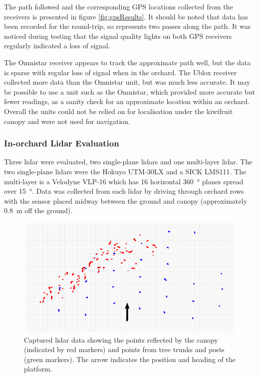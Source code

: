 \documentclass[preprint,authoryear,12pt]{elsarticle}
\begin{document}
        The path followed and the corresponding GPS locations collected from the receivers is presented in figure \ref{fig:gpsResults}.
        It should be noted that data has been recorded for the round-trip, so represents two passes along the path.
        It was noticed during testing that the signal quality lights on both GPS receivers regularly indicated a loss of signal.


        The Omnistar receiver appears to track the approximate path well, but the data is sparse with regular loss of signal when in the orchard.
    	The Ublox receiver collected more data than the Omnistar unit, but was much less accurate.
        It may be possible to use a unit such as the Omnistar, which provided more accurate but fewer readings, as a sanity check for an approximate location within an orchard.
        Overall the units could not be relied on for localisation under the kiwifruit canopy and were not used for navigation.

    \subsubsection{In-orchard Lidar Evaluation}
        Three lidar were evaluated, two single-plane lidars and one multi-layer lidar.
        The two single-plane lidars were the Hokuyo UTM-30LX and a SICK LMS111.
        The multi-layer is a Velodyne VLP-16 which has 16 horizontal \SI{360}{\degree} planes spread over \SI{15}{\degree}.
        Data was collected from each lidar by driving through orchard rows with the sensor placed midway between the ground and canopy (approximately \SI{0.8}{\meter} off the ground).

        \begin{figure}[htb]
            \centering
            \includegraphics[width=\linewidth]{imgs/canopy_data/canopy_data.pdf}
            \caption{
                Captured lidar data showing the points reflected by the canopy (indicated by red markers) and points from tree trunks and posts (green markers).
                The arrow indicates the position and heading of the platform.
            }
            \label{fig:canopyDataCloud}
        \end{figure}
\end{document}

